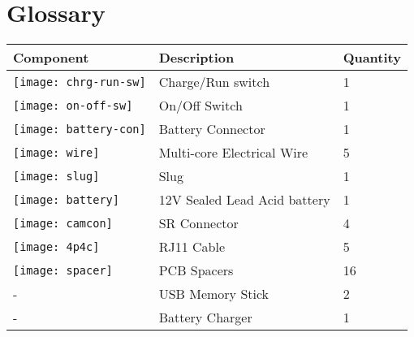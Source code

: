 
\section{Glossary}
\label{sec:glossary}
\begin{longtable}{| l | l| l |}
\hline
\textbf{Component} & \textbf{Description} & \textbf{Quantity} \\ \hline
\texttt{[image: chrg-run-sw]}  & Charge/Run switch & 1 \\ \hline
\texttt{[image: on-off-sw]}  & On/Off Switch & 1 \\ \hline
\texttt{[image: battery-con]}  & Battery Connector & 1 \\ \hline
\texttt{[image: wire]}  & Multi-core Electrical Wire & 5 \\ \hline
\texttt{[image: slug]}  & Slug & 1 \\ \hline
\texttt{[image: battery]}  & 12V Sealed Lead Acid battery & 1 \\ \hline
\texttt{[image: camcon]}  & SR Connector & 4 \\ \hline
\texttt{[image: 4p4c]}  & RJ11 Cable & 5 \\ \hline
\texttt{[image: spacer]}  & PCB Spacers & 16 \\ \hline
-  & USB Memory Stick & 2 \\ \hline
-  & Battery Charger & 1 \\ \hline
\end{longtable}
